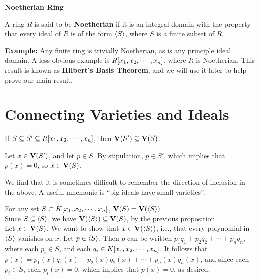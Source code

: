 \documentclass[twoside]{report}
\begin{document}
\begin{definition} \textbf{Noetherian Ring}

  A ring $R$ is said to be \textbf{Noetherian} if it is an integral
  domain with the property that every ideal of $R$ is of the form
  $\langle S\rangle$, where $S$ is a finite subset of $R$.

\end{definition}

\textbf{Example:} Any finite ring is trivially Noetherian, as is any
principle ideal domain.  A less obvious example is $R[x_1, x_2,\cdots,x_n]$, where
$R$ is Noetherian.  This result is known as \textbf{Hilbert's Basis
  Theorem}, and we will use it later to help prove our main result.

\section{Connecting Varieties and Ideals}

\begin{lemma} If $S \subseteq S' \subseteq R[x_1, x_2,\cdots,x_n]$, then
  $\mathbf{V}(S') \subseteq \mathbf{V}(S)$.
  
  Let $x \in \mathbf{V}(S')$, and let $p \in S$.  By stipulation, $p \in
  S'$, which implies that $p(x) = 0$, so $x \in \mathbf{V}(S)$.
\end{lemma}

We find that it is sometimes difficult to remember the direction of
inclusion in the above.  A useful mnemonic is ``big ideals have small
varieties''.

\begin{proposition} For any set $S \subset K[x_1, x_2,\cdots,x_n]$, $\mathbf{V}(S) = \mathbf{V}(\langle S\rangle)$\\

  Since $S \subseteq \langle S\rangle$, we have $\mathbf{V}(\langle S\rangle)
  \subseteq \mathbf{V}(S)$, by the previous proposition.\\

  Let $x \in \mathbf{V}(S)$. We want to show that $x \in
  \mathbf{V}(\langle S\rangle)$, i.e., that every polynomial in $\langle S\rangle$
  vanishes on $x$.  Let $p \in \langle S\rangle$.  Then $p$ can be written
  $p_1q_1 + p_2q_2 + \cdots + p_nq_n$, where each $p_i \in S$, and
  each $q_i \in K[x_1, x_2,\cdots,x_n]$.  It follows that $p(x) = p_1(x)q_1(x) +
  p_2(x)q_2(x) + \cdots + p_n(x)q_n(x)$, and since each $p_i \in S$,
  each $p_i(x) = 0$, which implies that $p(x) = 0$, as desired.

\end{proposition}
\end{document}
